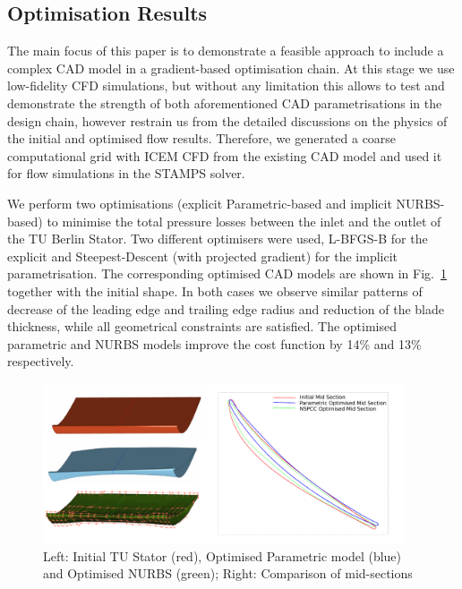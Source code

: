 \documentclass[9pt,academicons]{article}
\begin{document}
\subsection{Optimisation Results}
The main focus of this paper is to demonstrate a feasible approach to include a complex  CAD model in a gradient-based optimisation chain. At this stage we use low-fidelity CFD simulations, but without any limitation this allows to test and demonstrate the strength of both aforementioned CAD parametrisations in the design chain, however restrain us from the detailed discussions on the physics of the initial and optimised flow results. Therefore, we generated a coarse computational grid with ICEM CFD from the existing CAD model and used it for flow simulations in the STAMPS solver. 

We perform two optimisations (explicit Parametric-based and implicit NURBS-based) to minimise the total pressure losses between the inlet and the outlet of the TU Berlin Stator. Two different optimisers were used, L-BFGS-B for the explicit and Steepest-Descent (with projected gradient) for the implicit parametrisation. The corresponding optimised CAD models are shown in Fig.~\ref{fig:optimised} together with the initial shape. In both cases we observe similar patterns of decrease of the 
leading edge and trailing edge radius and reduction of the blade thickness, while all geometrical constraints are satisfied. The optimised parametric and NURBS models improve the cost function by 14\% and 13\% respectively.
\begin{figure}[!h]
\begin{center}
\includegraphics[width = 0.95\textwidth]{img/horisontal.pdf}
\caption{Left: Initial TU Stator (red), Optimised Parametric model (blue) and Optimised NURBS (green); Right: Comparison of mid-sections}
\label{fig:optimised}
\end{center}
\end{figure}
\end{document}
